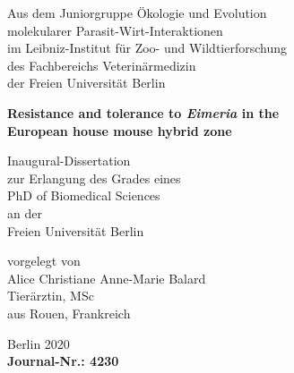 \begin{titlepage}
    \begin{center}
        Aus dem Juniorgruppe Ökologie und Evolution \\
        molekularer Parasit-Wirt-Interaktionen \\
        im Leibniz-Institut für Zoo- und Wildtierforschung \\
        des Fachbereichs Veterinärmedizin \\
        der Freien Universität Berlin
        
        \vfill
        \textbf{{\Large Resistance and tolerance to \textit{Eimeria} in the \\European house mouse hybrid zone}}
 
       \vfill
 
        Inaugural-Dissertation \\
        zur Erlangung des Grades eines \\
        PhD of Biomedical Sciences \\
        an der \\
        Freien Universität Berlin
 
        \vfill

        vorgelegt von \\
        Alice Christiane Anne-Marie Balard \\
        Tierärztin, MSc \\
        aus Rouen, Frankreich
        
        \vfill
        
        Berlin 2020 \\
        \textbf{Journal-Nr.: 4230}

    \end{center}
\end{titlepage}
